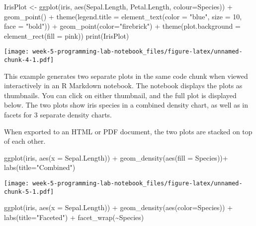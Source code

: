 \documentclass[
]{article}
\newenvironment{Shaded}{\begin{snugshade}}{\end{snugshade}}
\newcommand{\AttributeTok}[1]{\textcolor[rgb]{0.77,0.63,0.00}{#1}}
\newcommand{\DecValTok}[1]{\textcolor[rgb]{0.00,0.00,0.81}{#1}}
\newcommand{\FunctionTok}[1]{\textcolor[rgb]{0.00,0.00,0.00}{#1}}
\newcommand{\NormalTok}[1]{#1}
\newcommand{\OtherTok}[1]{\textcolor[rgb]{0.56,0.35,0.01}{#1}}
\newcommand{\SpecialCharTok}[1]{\textcolor[rgb]{0.00,0.00,0.00}{#1}}
\newcommand{\StringTok}[1]{\textcolor[rgb]{0.31,0.60,0.02}{#1}}
\begin{document}
\begin{Shaded}
\begin{Highlighting}[]
\NormalTok{IrisPlot }\OtherTok{\textless{}{-}} \FunctionTok{ggplot}\NormalTok{(iris, }\FunctionTok{aes}\NormalTok{(Sepal.Length, Petal.Length, }\AttributeTok{colour=}\NormalTok{Species)) }\SpecialCharTok{+} 
  \FunctionTok{geom\_point}\NormalTok{() }\SpecialCharTok{+} 
  \FunctionTok{theme}\NormalTok{(}\AttributeTok{legend.title =} \FunctionTok{element\_text}\NormalTok{(}\AttributeTok{color =} \StringTok{"blue"}\NormalTok{, }\AttributeTok{size =} \DecValTok{10}\NormalTok{, }\AttributeTok{face =} \StringTok{"bold"}\NormalTok{)) }\SpecialCharTok{+}
  \FunctionTok{geom\_point}\NormalTok{(}\AttributeTok{color=}\StringTok{"firebrick"}\NormalTok{) }\SpecialCharTok{+}
  \FunctionTok{theme}\NormalTok{(}\AttributeTok{plot.background =} \FunctionTok{element\_rect}\NormalTok{(}\AttributeTok{fill =} \StringTok{\textquotesingle{}pink\textquotesingle{}}\NormalTok{))}
\FunctionTok{print}\NormalTok{(IrisPlot)}
\end{Highlighting}
\end{Shaded}

\texttt{[image: week-5-programming-lab-notebook\_files/figure-latex/unnamed-chunk-4-1.pdf]}

This example generates two separate plots in the same code chunk when
viewed interactively in an R Markdown notebook. The notebook displays
the plots as thumbnails. You can click on either thumbnail, and the full
plot is displayed below. The two plots show iris species in a combined
density chart, as well as in facets for 3 separate density charts.

When exported to an HTML or PDF document, the two plots are stacked on
top of each other.

\begin{Shaded}
\begin{Highlighting}[]
\FunctionTok{ggplot}\NormalTok{(iris, }\FunctionTok{aes}\NormalTok{(}\AttributeTok{x =}\NormalTok{ Sepal.Length)) }\SpecialCharTok{+}
  \FunctionTok{geom\_density}\NormalTok{(}\FunctionTok{aes}\NormalTok{(}\AttributeTok{fill =}\NormalTok{ Species))}\SpecialCharTok{+}
  \FunctionTok{labs}\NormalTok{(}\AttributeTok{title=}\StringTok{"Combined"}\NormalTok{) }
\end{Highlighting}
\end{Shaded}

\texttt{[image: week-5-programming-lab-notebook\_files/figure-latex/unnamed-chunk-5-1.pdf]}

\begin{Shaded}
\begin{Highlighting}[]
\FunctionTok{ggplot}\NormalTok{(iris, }\FunctionTok{aes}\NormalTok{(}\AttributeTok{x =}\NormalTok{ Sepal.Length)) }\SpecialCharTok{+}
  \FunctionTok{geom\_density}\NormalTok{(}\FunctionTok{aes}\NormalTok{(}\AttributeTok{color=}\NormalTok{Species)) }\SpecialCharTok{+}
  \FunctionTok{labs}\NormalTok{(}\AttributeTok{title=}\StringTok{"Faceted"}\NormalTok{) }\SpecialCharTok{+}
  \FunctionTok{facet\_wrap}\NormalTok{(}\SpecialCharTok{\textasciitilde{}}\NormalTok{Species)}
\end{Highlighting}
\end{Shaded}
\end{document}
